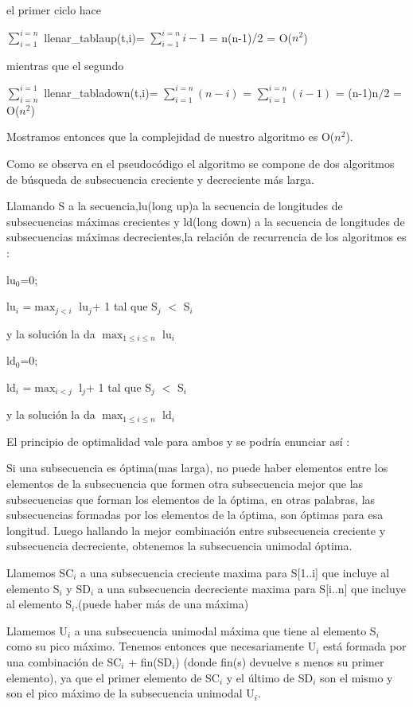 el primer ciclo hace

$\sum_{i=1}^{i=n}$ llenar\_tablaup(t,i)= $\sum_{i=1}^{i=n} i-1 $ = n(n-1)$/$2 = O($n^{2}$)

mientras que el segundo

$\sum_{i=n}^{i=1}$ llenar\_tabladown(t,i)= $\sum_{i=1}^{i=n}(n-i)$ = $\sum_{i=1}^{i=n}(i-1)$ = (n-1)n$/$2 = O($n^{2}$)
                       
Mostramos entonces que la complejidad de nuestro algoritmo es O($n^{2}$).

Como se observa en el pseudocódigo el algoritmo se compone de dos algoritmos de búsqueda de subsecuencia creciente y decreciente más larga.

Llamando S a la secuencia,lu(long up)a la secuencia de longitudes de subsecuencias máximas crecientes  y ld(long down) a la secuencia de longitudes de subsecuencias máximas decrecientes,la relación de recurrencia de los algoritmos es :

lu$_0$=0;

lu$_i$ =$\max_{j<i}$ lu$_j$+ 1  tal que S$_j$ $<$ S$_i$  

y la solución la da $\max_{1\leq i\leq n}$ lu$_i$

ld$_0$=0;

ld$_i$ =$\max_{i<j}$ l$_j$+ 1  tal que S$_j$ $<$ S$_i$ 

y la solución la da $\max_{1\leq i\leq n}$ ld$_i$


El principio de optimalidad vale para ambos y se podría enunciar así : 

Si una subsecuencia es óptima(mas larga), no puede haber elementos entre los elementos de la subsecuencia que formen otra subsecuencia mejor que las subsecuencias que forman los elementos de la óptima, en otras palabras, las subsecuencias formadas por los elementos de la óptima, son óptimas para esa longitud.
Luego hallando la mejor combinación entre subsecuencia creciente y subsecuencia decreciente, obtenemos la subsecuencia unimodal óptima. 


Llamemos SC${_i}$ a una subsecuencia creciente maxima para S[1..i] que incluye al elemento S$_i$ y SD${_i}$ a una subsecuencia decreciente maxima para S[i..n] que incluye al elemento S${_i}$.(puede haber más de una máxima)

Llamemos U${_i}$ a una subsecuencia unimodal máxima que tiene al elemento S${_i}$ como su pico máximo.
Tenemos entonces que necesariamente U${_i}$ está formada por una combinación de SC${_i}$ + fin(SD${_i}$) (donde fin(s) devuelve s menos su primer elemento), ya que el primer elemento de SC${_i}$ y el último de SD${_i}$ son el mismo y son el pico máximo de la subsecuencia unimodal U${_i}$.

